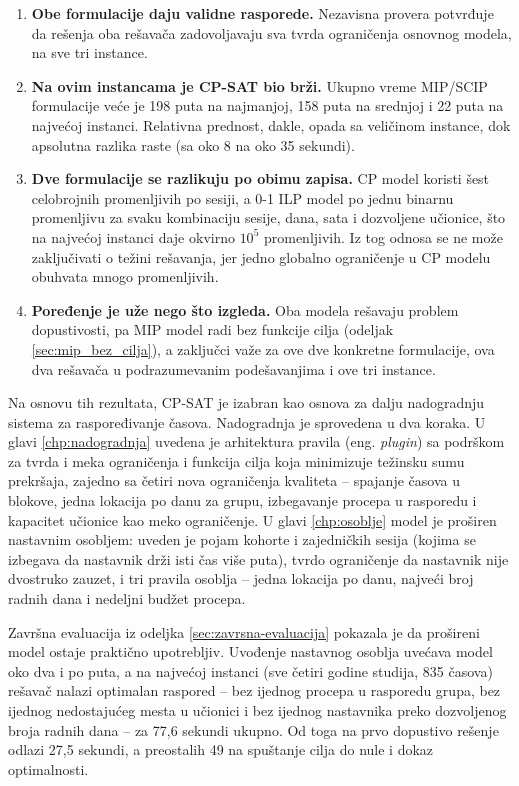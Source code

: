 \documentclass[12pt,oneside]{memoir}
\begin{document}
\begin{enumerate}
\item \textbf{Obe formulacije daju validne rasporede.}
  Nezavisna provera potvrđuje da rešenja oba rešavača zadovoljavaju sva
  tvrda ograničenja osnovnog modela, na sve tri instance.

\item \textbf{Na ovim instancama je CP-SAT bio brži.}
  Ukupno vreme MIP/SCIP formulacije veće je 198 puta na najmanjoj, 158
  puta na srednjoj i 22 puta na najvećoj instanci. Relativna prednost,
  dakle, opada sa veličinom instance, dok apsolutna razlika raste
  (sa oko 8 na oko 35 sekundi).

\item \textbf{Dve formulacije se razlikuju po obimu zapisa.}
  CP model koristi šest celobrojnih promenljivih po sesiji, a 0-1 ILP
  model po jednu binarnu promenljivu za svaku kombinaciju sesije, dana,
  sata i dozvoljene učionice, što na najvećoj instanci daje okvirno
  $10^5$ promenljivih. Iz tog odnosa se ne može zaključivati o težini
  rešavanja, jer jedno globalno ograničenje u CP modelu obuhvata mnogo
  promenljivih.

\item \textbf{Poređenje je uže nego što izgleda.}
  Oba modela rešavaju problem dopustivosti, pa MIP model radi bez
  funkcije cilja (odeljak \ref{sec:mip_bez_cilja}), a zaključci važe za
  ove dve konkretne formulacije, ova dva rešavača u podrazumevanim
  podešavanjima i ove tri instance.
\end{enumerate}

Na osnovu tih rezultata, CP-SAT je izabran kao osnova za dalju
nadogradnju sistema za raspoređivanje časova. Nadogradnja je sprovedena
u dva koraka. U glavi \ref{chp:nadogradnja} uvedena je arhitektura
pravila (eng. \emph{plugin}) sa podrškom za tvrda i meka ograničenja i
funkcija cilja koja minimizuje težinsku sumu prekršaja, zajedno sa
četiri nova ograničenja kvaliteta -- spajanje časova u blokove, jedna
lokacija po danu za grupu, izbegavanje procepa u rasporedu i kapacitet
učionice kao meko ograničenje. U glavi
\ref{chp:osoblje} model je proširen nastavnim osobljem: uveden je pojam
kohorte i zajedničkih sesija (kojima se izbegava da nastavnik drži isti
čas više puta), tvrdo ograničenje da nastavnik nije dvostruko zauzet, i
tri pravila osoblja -- jedna lokacija po danu, najveći broj radnih dana i
nedeljni budžet procepa.

Završna evaluacija iz odeljka \ref{sec:zavrsna-evaluacija} pokazala je
da prošireni model ostaje praktično upotrebljiv. Uvođenje nastavnog
osoblja uvećava model oko dva i po puta, a na najvećoj instanci (sve
četiri godine studija, 835 časova) rešavač nalazi optimalan
raspored -- bez ijednog procepa u rasporedu grupa, bez ijednog
nedostajućeg mesta u učionici i bez ijednog nastavnika preko dozvoljenog
broja radnih dana -- za 77,6 sekundi ukupno.
Od toga na prvo dopustivo rešenje odlazi 27,5
sekundi, a preostalih 49 na spuštanje cilja do nule i dokaz
optimalnosti.
\end{document}

